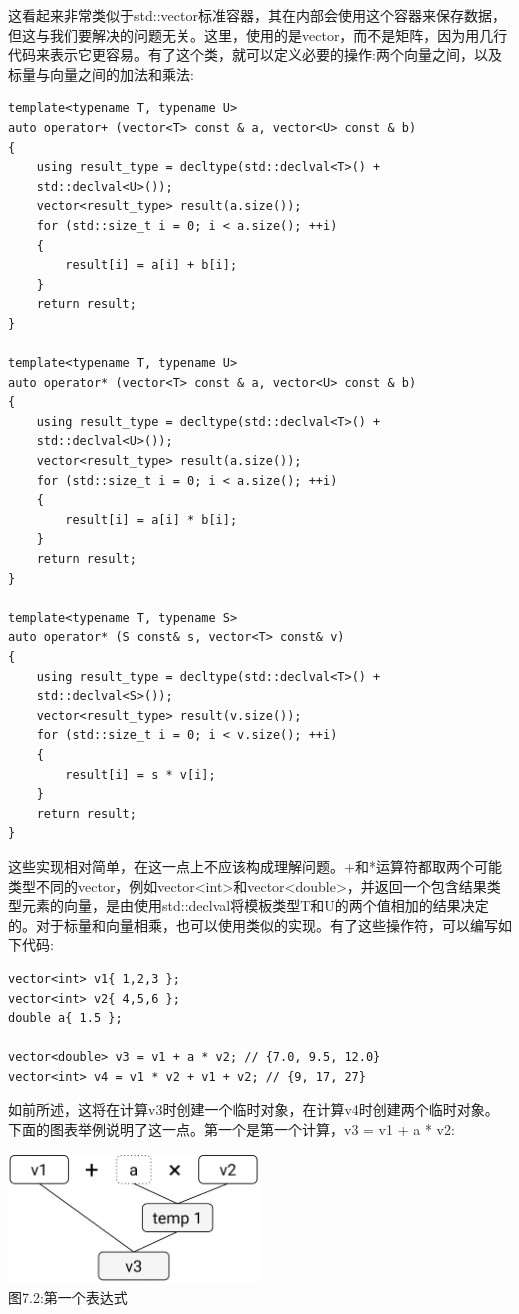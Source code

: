 这看起来非常类似于std::vector标准容器，其在内部会使用这个容器来保存数据，但这与我们要解决的问题无关。这里，使用的是vector，而不是矩阵，因为用几行代码来表示它更容易。有了这个类，就可以定义必要的操作:两个向量之间，以及标量与向量之间的加法和乘法:

\begin{lstlisting}[style=styleCXX]
template<typename T, typename U>
auto operator+ (vector<T> const & a, vector<U> const & b)
{
	using result_type = decltype(std::declval<T>() +
	std::declval<U>());
	vector<result_type> result(a.size());
	for (std::size_t i = 0; i < a.size(); ++i)
	{
		result[i] = a[i] + b[i];
	}
	return result;
}

template<typename T, typename U>
auto operator* (vector<T> const & a, vector<U> const & b)
{
	using result_type = decltype(std::declval<T>() +
	std::declval<U>());
	vector<result_type> result(a.size());
	for (std::size_t i = 0; i < a.size(); ++i)
	{
		result[i] = a[i] * b[i];
	}
	return result;
}

template<typename T, typename S>
auto operator* (S const& s, vector<T> const& v)
{
	using result_type = decltype(std::declval<T>() +
	std::declval<S>());
	vector<result_type> result(v.size());
	for (std::size_t i = 0; i < v.size(); ++i)
	{
		result[i] = s * v[i];
	}
	return result;
}
\end{lstlisting}

这些实现相对简单，在这一点上不应该构成理解问题。+和*运算符都取两个可能类型不同的vector，例如vector<int>和vector<double>，并返回一个包含结果类型元素的向量，是由使用std::declval将模板类型T和U的两个值相加的结果决定的。对于标量和向量相乘，也可以使用类似的实现。有了这些操作符，可以编写如下代码:

\begin{lstlisting}[style=styleCXX]
vector<int> v1{ 1,2,3 };
vector<int> v2{ 4,5,6 };
double a{ 1.5 };

vector<double> v3 = v1 + a * v2; // {7.0, 9.5, 12.0}
vector<int> v4 = v1 * v2 + v1 + v2; // {9, 17, 27}
\end{lstlisting}

如前所述，这将在计算v3时创建一个临时对象，在计算v4时创建两个临时对象。下面的图表举例说明了这一点。第一个是第一个计算，v3 = v1 + a * v2:

\begin{center}
\includegraphics[width=0.5\textwidth]{content/3/chapter7/images/2.png}\\
图7.2:第一个表达式
\end{center}

